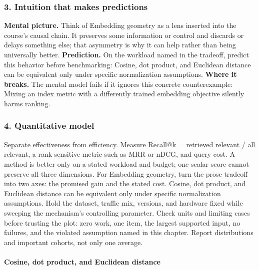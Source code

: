 \subsubsection*{3. Intuition that makes predictions}
\textbf{Mental picture.} Think of Embedding geometry as a lens inserted into the course's causal chain. It preserves some information or control and discards or delays something else; that asymmetry is why it can help rather than being universally better.
\textbf{Prediction.} On the workload named in the tradeoff, predict this behavior before benchmarking: Cosine, dot product, and Euclidean distance can be equivalent only under specific normalization assumptions.
\textbf{Where it breaks.} The mental model fails if it ignores this concrete counterexample: Mixing an index metric with a differently trained embedding objective silently harms ranking.
\subsubsection*{4. Quantitative model}
Separate effectiveness from efficiency. Measure Recall@k = retrieved relevant / all relevant, a rank-sensitive metric such as MRR or nDCG, and query cost. A method is better only on a stated workload and budget; one scalar score cannot preserve all three dimensions.
For Embedding geometry, turn the prose tradeoff into two axes: the promised gain and the stated cost. Cosine, dot product, and Euclidean distance can be equivalent only under specific normalization assumptions. Hold the dataset, traffic mix, versions, and hardware fixed while sweeping the mechanism's controlling parameter.
Check units and limiting cases before trusting the plot: zero work, one item, the largest supported input, no failures, and the violated assumption named in this chapter. Report distributions and important cohorts, not only one average.
\paragraph{Cosine, dot product, and Euclidean distance}
